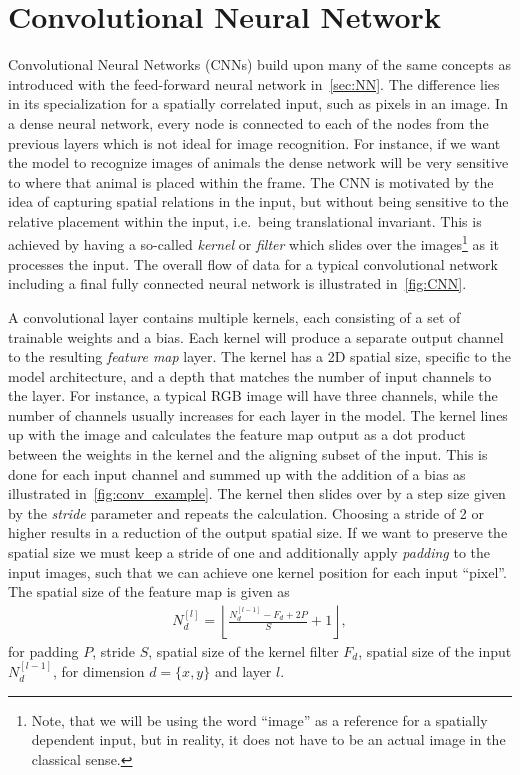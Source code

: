 \section{Convolutional Neural Network}\label{sec:CNN}
Convolutional Neural Networks (\acrshort{CNN}s) build upon many of the same
concepts as introduced with the feed-forward neural network in~\cref{sec:NN}.
The difference lies in its specialization for a spatially correlated input, such
as pixels in an image. In a dense neural network, every node is connected to
each of the nodes from the previous layers which is not ideal for image
recognition. For instance, if we want the model to recognize images of animals
the dense network will be very sensitive to where that animal is placed within
the frame. The \acrshort{CNN} is motivated by the idea of capturing spatial
relations in the input, but without being sensitive to the relative placement
within the input, i.e.\ being translational invariant. This is achieved by
having a so-called \textit{kernel} or \textit{filter} which slides over the
images\footnote{Note, that we will be using the word ``image'' as a reference
for a spatially dependent input, but in reality, it does not have to be an
actual image in the classical sense.} as it processes the input. The overall flow of data for a typical convolutional network including a final fully connected neural network is illustrated in~\cref{fig:CNN}. 

A convolutional layer contains multiple kernels, each consisting of a set of
trainable weights and a bias. Each kernel will produce a separate output channel
to the resulting \textit{feature map} layer. The kernel has a 2D spatial size,
specific to the model architecture, and a depth that matches the number of input
channels to the layer. For instance, a typical RGB image will have three
channels, while the number of channels usually increases for each layer in the
model. The kernel lines up with the image and calculates the feature map output
as a dot product between the weights in the kernel and the aligning subset of
the input. This is done for each input channel and summed up with the addition
of a bias as illustrated in~\cref{fig:conv_example}. The kernel then slides over by a
step size given by the \textit{stride} parameter and repeats the
calculation. Choosing a stride of 2 or higher results in a reduction of the
output spatial size. If we want to preserve the spatial size we must keep a
stride of one and additionally apply \textit{padding} to the input images, such
that we can achieve one kernel position for each input ``pixel''. The spatial
size of the feature map is given as
\begin{align}
  N_d^{[l]} = \left\lfloor \frac{N_d^{[l-1]} - F_d + 2P}{S} + 1 \right\rfloor,
  \label{eq:down_scaling}
\end{align}
for padding $P$, stride $S$, spatial size of the kernel filter $F_d$, spatial
size of the input $N_d^{[l-1]}$, for dimension $d = \{x, y\}$ and layer $l$. 


